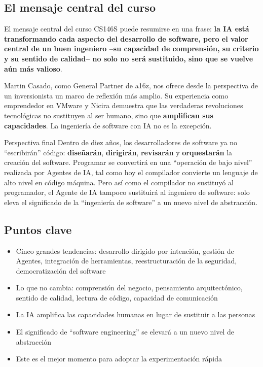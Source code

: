 \documentclass[a4paper]{article}
\begin{document}
\subsection{El mensaje central del curso}

El mensaje central del curso CS146S puede resumirse en una frase: \textbf{la IA está transformando cada aspecto del desarrollo de software, pero el valor central de un buen ingeniero --su capacidad de comprensión, su criterio y su sentido de calidad-- no solo no será sustituido, sino que se vuelve aún más valioso}.

Martin Casado, como General Partner de a16z, nos ofrece desde la perspectiva de un inversionista un marco de reflexión más amplio. Su experiencia como emprendedor en VMware y Nicira demuestra que las verdaderas revoluciones tecnológicas no sustituyen al ser humano, sino que \textbf{amplifican sus capacidades}. La ingeniería de software con IA no es la excepción.

\begin{importantbox}{Perspectiva final}
Dentro de diez años, los desarrolladores de software ya no ``escribirán'' código: \textbf{diseñarán}, \textbf{dirigirán}, \textbf{revisarán} y \textbf{orquestarán} la creación del software. Programar se convertirá en una ``operación de bajo nivel'' realizada por Agentes de IA, tal como hoy el compilador convierte un lenguaje de alto nivel en código máquina. Pero así como el compilador no sustituyó al programador, el Agente de IA tampoco sustituirá al ingeniero de software: solo eleva el significado de la ``ingeniería de software'' a un nuevo nivel de abstracción.
\end{importantbox}

\subsection{Puntos clave}

\begin{itemize}
    \item Cinco grandes tendencias: desarrollo dirigido por intención, gestión de Agentes, integración de herramientas, reestructuración de la seguridad, democratización del software
    \item Lo que no cambia: comprensión del negocio, pensamiento arquitectónico, sentido de calidad, lectura de código, capacidad de comunicación
    \item La IA amplifica las capacidades humanas en lugar de sustituir a las personas
    \item El significado de ``software engineering'' se elevará a un nuevo nivel de abstracción
    \item Este es el mejor momento para adoptar la experimentación rápida
\end{itemize}
\end{document}
